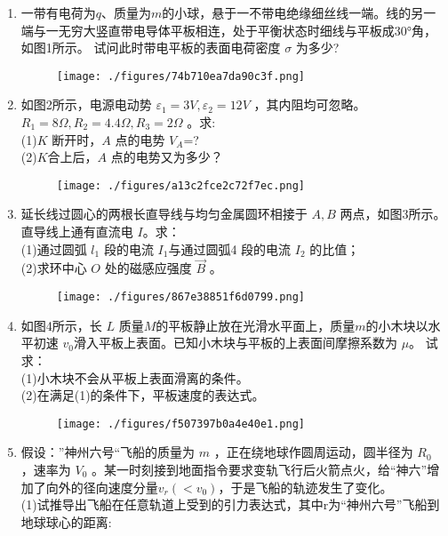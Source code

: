 
\begin{enumerate}
\item 一带有电荷为$q$、质量为$m$的小球，悬于一不带电绝缘细丝线一端。线的另一端与一无穷大竖直带电导体平板相连，处于平衡状态时细线与平板成$30$°角，如图1所示。 试问此时带电平板的表面电荷密度 $\sigma$ 为多少?
\begin{figure}[ht]
\centering
\texttt{[image: ./figures/74b710ea7da90c3f.png]}
\caption{} \label{fig_ZKYP06_1}
\end{figure}
\item 如图2所示，电源电动势  $\varepsilon_1=3V,\varepsilon_2=12V$ ，其内阻均可忽略。 $R_1=8\Omega,R_2=4.4\Omega,R_3=2\Omega$  。求:\\
(1)$K$ 断开时，$A$  点的电势  $V_A$=?\\
(2)$K$合上后，$A$  点的电势又为多少？
\begin{figure}[ht]
\centering
\texttt{[image: ./figures/a13c2fce2c72f7ec.png]}
\caption{} \label{fig_ZKYP06_2}
\end{figure}
\item 延长线过圆心的两根长直导线与均匀金属圆环相接于 $A,B $ 两点，如图3所示。直导线上通有直流电 $I$。求：\\
(1)通过圆弧 $l_1$ 段的电流 $I_1 $与通过圆弧4 段的电流 $I_2$ 的比值；\\
(2)求环中心 $O$ 处的磁感应强度 $\vec B$ 。
\begin{figure}[ht]
\centering
\texttt{[image: ./figures/867e38851f6d0799.png]}
\caption{} \label{fig_ZKYP06_3}
\end{figure}
\item 如图4所示，长 $L$ 质量$M$的平板静止放在光滑水平面上，质量$m$的小木块以水平初速 $v_0$滑入平板上表面。已知小木块与平板的上表面间摩擦系数为 $\mu $。 试求：\\
(1)小木块不会从平板上表面滑离的条件。\\
(2)在满足(1)的条件下，平板速度的表达式。
\begin{figure}[ht]
\centering
\texttt{[image: ./figures/f507397b0a4e40e1.png]}
\caption{} \label{fig_ZKYP06_4}
\end{figure}
\item 假设：”神州六号“飞船的质量为 $m$ ，正在绕地球作圆周运动，圆半径为 $R_0$ ，速率为 $V_0$ 。某一时刻接到地面指令要求变轨飞行后火箭点火，给“神六”增加了向外的径向速度分量$v_r(<v_0)$，于是飞船的轨迹发生了变化。\\
(1)试推导出飞船在任意轨道上受到的引力表达式$$，其中r为“神州六号”飞船到地球球心的距离:
\end{enumerate}
